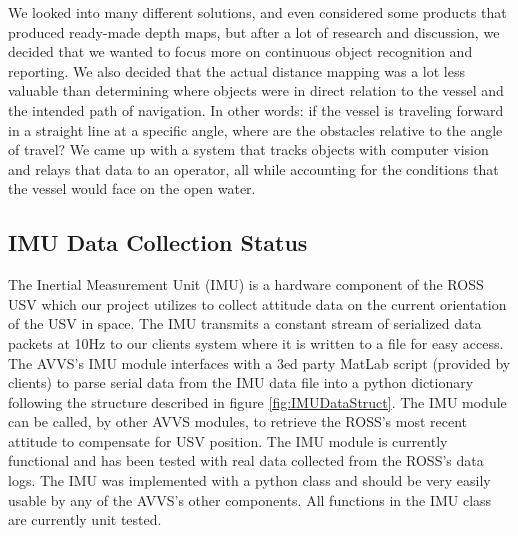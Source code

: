 \documentclass[onecolumn, draftclsnofoot,10pt, compsoc]{IEEEtran}
\begin{document}
We looked into many different solutions, and even considered some products that produced ready-made depth maps, but after a lot of research and discussion, we decided that we wanted to focus more on continuous object recognition and reporting. We also decided that the actual distance mapping was a lot less valuable than determining where objects were in direct relation to the vessel and the intended path of navigation. In other words: if the vessel is traveling forward in a straight line at a specific angle, where are the obstacles relative to the angle of travel? We came up with a system that tracks objects with computer vision and relays that data to an operator, all while accounting for the conditions that the vessel would face on the open water.

\subsection{IMU Data Collection Status}
The Inertial Measurement Unit (IMU) is a hardware component of the ROSS USV which our project utilizes to collect attitude data on the current orientation of the USV in space. The IMU transmits a constant stream of serialized data packets at 10Hz to our clients system where it is written to a file for easy access. The AVVS's IMU module interfaces with a 3ed party MatLab script (provided by clients) to parse serial data from the IMU data file into a python dictionary following the structure described in figure \ref{fig:IMUDataStruct}. The IMU module can be called, by other AVVS modules, to retrieve the ROSS's most recent attitude to compensate for USV position. The IMU module is currently functional and has been tested with real data collected from the ROSS's data logs. The IMU was implemented with a python class and should be very easily usable by any of the AVVS's other components. All functions in the IMU class are currently unit tested.
\end{document}
